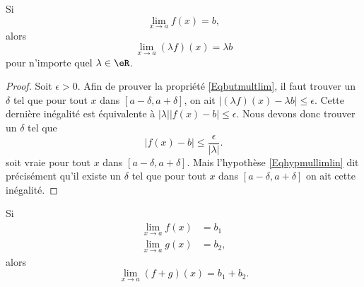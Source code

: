 \begin{theorem}     \label{ThoLimLinMul}
	Si
	\begin{equation} \label{Eqhypmullimlin}
		\lim_{x\to a}f(x)=b,
	\end{equation}
	alors
	\begin{equation} \label{Eqbutmultlim}
		\lim_{x\to a}(\lambda f)(x)=\lambda b
	\end{equation}
	pour n'importe quel \( \lambda\in\eR\).
\end{theorem}

\begin{proof}
	Soit \( \epsilon>0\). Afin de prouver la propriété \eqref{Eqbutmultlim}, il faut trouver un \( \delta\) tel que pour tout \( x\) dans \( [a-\delta,a+\delta]\), on ait \( | (\lambda f)(x)- \lambda b |\leq\epsilon\). Cette dernière inégalité est équivalente à \( |\lambda|| f(x)-b |\leq\epsilon\). Nous devons donc trouver un \( \delta\) tel que
	\begin{equation}
		| f(x)-b |\leq\frac{ \epsilon }{ | \lambda | }.
	\end{equation}
	soit vraie pour tout \( x\) dans \( [a-\delta,a+\delta]\). Mais l'hypothèse \eqref{Eqhypmullimlin} dit précisément qu'il existe un \( \delta\) tel que pour tout \( x\) dans \( [a-\delta,a+\delta]\) on ait cette inégalité.
\end{proof}

\begin{theorem}     \label{ThoLimLin}
	Si
	\begin{subequations}
		\begin{align}
			\lim_{x\to a}f(x) & = b_1   \\
			\lim_{x\to a}g(x) & = b_2,
		\end{align}
	\end{subequations}
	alors
	\begin{equation}
		\lim_{x\to a}(f+g)(x)=b_1+b_2.
	\end{equation}
\end{theorem}


